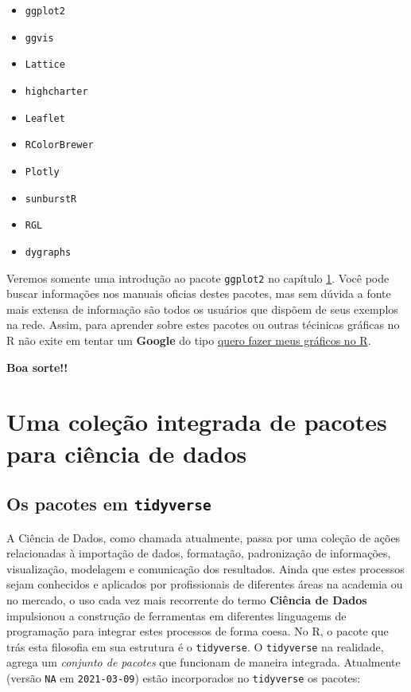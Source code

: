 \documentclass[
]{book}
\providecommand{\tightlist}{%
  \setlength{\itemsep}{0pt}\setlength{\parskip}{0pt}}
\begin{document}
\begin{itemize}
\tightlist
\item
  \texttt{ggplot2}
\item
  \texttt{ggvis}
\item
  \texttt{Lattice}
\item
  \texttt{highcharter}
\item
  \texttt{Leaflet}
\item
  \texttt{RColorBrewer}
\item
  \texttt{Plotly}
\item
  \texttt{sunburstR}
\item
  \texttt{RGL}
\item
  \texttt{dygraphs}
\end{itemize}

Veremos somente uma introdução ao pacote \texttt{ggplot2} no capítulo \ref{tidy}. Você pode buscar informações nos manuais oficias destes pacotes, mas sem dúvida a fonte mais extensa de informação são todos os usuários que dispõem de seus exemplos na rede. Assim, para aprender sobre estes pacotes ou outras técinicas gráficas no R não exite em tentar um \textbf{Google} do tipo \href{https://www.google.com.br/search?sxsrf=ALeKk00KUMfabSYS-mRTqdTiLdeOR65jnA\%3A1594162286064\&source=hp\&ei=bvwEX8TUAZm25OUP0LCXsAw\&q=quero+fazer+meus+gr\%C3\%A1ficos+no+R\&oq=quero+fazer+meus+gr\%C3\%A1ficos+no+R\&gs_lcp=CgZwc3ktYWIQA1DwDVjwDWCRF2gAcAB4AIABmgGIAZoBkgEDMC4xmAEAoAECoAEBqgEHZ3dzLXdpeg\&sclient=psy-ab\&ved=0ahUKEwjEw5emnbzqAhUZG7kGHVDYBcYQ4dUDCAc\&uact=5}{quero fazer meus gráficos no R}.

\textbf{Boa sorte!!}

\hypertarget{part-uma-coleuxe7uxe3o-integrada-de-pacotes-para-ciuxeancia-de-dados}{%
\part{Uma coleção integrada de pacotes para ciência de dados}\label{part-uma-coleuxe7uxe3o-integrada-de-pacotes-para-ciuxeancia-de-dados}}

\hypertarget{tidy}{%
\chapter{\texorpdfstring{Os pacotes em \texttt{tidyverse}}{Os pacotes em tidyverse}}\label{tidy}}

A Ciência de Dados, como chamada atualmente, passa por uma coleção de ações relacionadas à importação de dados, formatação, padronização de informações, visualização, modelagem e comunicação dos resultados. Ainda que estes processos sejam conhecidos e aplicados por profissionais de diferentes áreas na academia ou no mercado, o uso cada vez mais recorrente do termo \textbf{Ciência de Dados} impulsionou a construção de ferramentas em diferentes linguagems de programação para integrar estes processos de forma coesa. No R, o pacote que trás esta filosofia em sua estrutura é o \texttt{tidyverse}. O \texttt{tidyverse} na realidade, agrega um \emph{conjunto de pacotes} que funcionam de maneira integrada. Atualmente (versão \texttt{NA} em \texttt{2021-03-09}) estão incorporados no \texttt{tidyverse} os pacotes:
\end{document}
